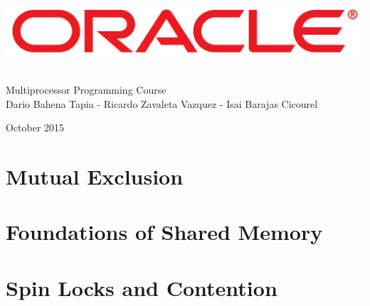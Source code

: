 \documentclass[letter,12pt]{report}
\begin{document}
\begin{titlepage}
\begin{center}

~\\[4 cm]

\includegraphics[width=15 cm]{Oracle_Logo.pdf}

~\\[0.5 cm]

{\LARGE Multiprocessor Programming Course} \\[0.2 cm]

{Dario Bahena Tapia - Ricardo Zavaleta Vazquez - Isai Barajas Cicourel}

{\small October 2015}

\end{center}
\end{titlepage}


\chapter{Mutual Exclusion}




\chapter{Foundations of Shared Memory}




\chapter{Spin Locks and Contention}



\end{document}
